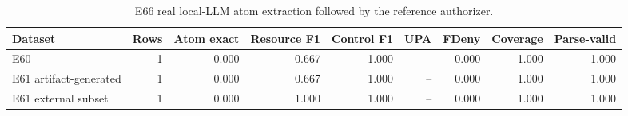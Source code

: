 \begin{table}[t]
\centering
\caption{E66 real local-LLM atom extraction followed by the reference authorizer.}
\label{tab:e66-real-llm-atom-extractor}
\begin{tabular}{lrrrrrrrr}
\toprule
Dataset & Rows & Atom exact & Resource F1 & Control F1 & UPA & FDeny & Coverage & Parse-valid \\
\midrule
E60 & 1 & 0.000 & 0.667 & 1.000 & -- & 0.000 & 1.000 & 1.000 \\
E61 artifact-generated & 1 & 0.000 & 0.667 & 1.000 & -- & 0.000 & 1.000 & 1.000 \\
E61 external subset & 1 & 0.000 & 1.000 & 1.000 & -- & 0.000 & 1.000 & 1.000 \\
\bottomrule
\end{tabular}
\end{table}
